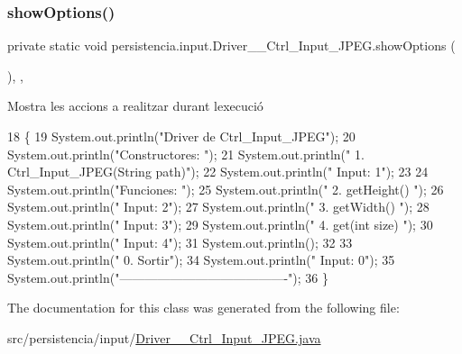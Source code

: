 \mbox{\label{classpersistencia_1_1input_1_1Driver____Ctrl__Input__JPEG_a3ffde336b648d23ae0a517210d0f8f38}} 
\subsubsection{\texorpdfstring{show\+Options()}{showOptions()}}
{\footnotesize\ttfamily private static void persistencia.\+input.\+Driver\+\_\+\+\_\+\+Ctrl\+\_\+\+Input\+\_\+\+J\+P\+E\+G.\+show\+Options (\begin{DoxyParamCaption}{ }\end{DoxyParamCaption})\hspace{0.3cm}{\ttfamily [inline]}, {\ttfamily [static]}, {\ttfamily [private]}}



Mostra les accions a realitzar durant l\textquotesingle{}execució 


\begin{DoxyCode}
18                                      \{
19         System.out.println(\textcolor{stringliteral}{"Driver de Ctrl\_Input\_JPEG"});
20         System.out.println(\textcolor{stringliteral}{"Constructores: "});
21         System.out.println(\textcolor{stringliteral}{"     1. Ctrl\_Input\_JPEG(String path)"});
22         System.out.println(\textcolor{stringliteral}{"     Input: 1"});
23 
24         System.out.println(\textcolor{stringliteral}{"Funciones: "});
25         System.out.println(\textcolor{stringliteral}{"     2. getHeight() "});
26         System.out.println(\textcolor{stringliteral}{"     Input: 2"});
27         System.out.println(\textcolor{stringliteral}{"     3. getWidth() "});
28         System.out.println(\textcolor{stringliteral}{"     Input: 3"});
29         System.out.println(\textcolor{stringliteral}{"     4. get(int size) "});
30         System.out.println(\textcolor{stringliteral}{"     Input: 4"});
31         System.out.println();
32 
33         System.out.println(\textcolor{stringliteral}{"     0. Sortir"});
34         System.out.println(\textcolor{stringliteral}{"     Input: 0"});
35         System.out.println(\textcolor{stringliteral}{"----------------------------------------"});
36     \}
\end{DoxyCode}


The documentation for this class was generated from the following file\+:\begin{DoxyCompactItemize}
\item 
src/persistencia/input/\hyperlink{Driver____Ctrl__Input__JPEG_8java}{Driver\+\_\+\+\_\+\+Ctrl\+\_\+\+Input\+\_\+\+J\+P\+E\+G.\+java}\end{DoxyCompactItemize}
